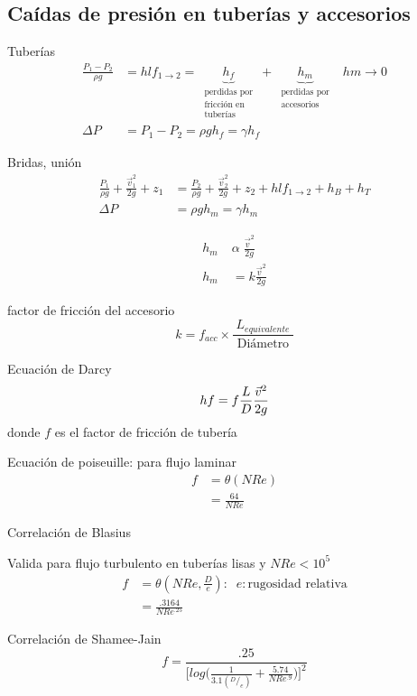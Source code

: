 \subsection{Caídas de presión en tuberías y accesorios}
Tuberías
\[
    \begin{split}
        \frac{ P_{1} - P_{2} }{ \rho g } & = hlf_{1 \to 2} = \underbrace{ h_{f} }_{
            \begin{array}{cc}
                \text{ perdidas por } \\
                \text{ fricción en } \\
                \text{ tuberías }
            \end{array}             
        } + \underbrace{ h_{m} }_{ 
            \begin{array}{cc}
                \text{ perdidas por } \\
                \text{ accesorios }
            \end{array}
        } \;\; hm \to 0 \\
        \Delta P & = P_{1} - P_{2} = \rho g h_{f} = \gamma h_{f}
    \end{split}
\]

Bridas, unión
\[
    \begin{split}
        \frac{ P_{1} }{ \rho g } + \frac{ \Vec{v}_{1}^{2} }{ 2g } + z_{1} & = \frac{ P_{2} }{ \rho g } + \frac{ \Vec{v}_{2}^{2} }{ 2g } + z_{2} + hlf_{1 \to 2} + h_{B} + h_{T} \\
        \Delta P & = \rho g h_{m} = \gamma h_{m}
    \end{split}
\]

\[
    \begin{split}
        h_{m} \; & \alpha \; \frac{ \Vec{v}^{2} }{ 2g } \\
        h_{m} & = k \frac{ \Vec{v}^{2} }{ 2g }
    \end{split}
\]

factor de fricción del accesorio
\[
    k = f_{acc} \times \frac{ L_{equivalente} }{ \text{ Diámetro } }
\]

Ecuación de Darcy
\[
    hf = f \frac{ L }{ D } \frac{ \Vec{v}^{2} }{ 2g } \\
\]
donde \( f \) es el factor de fricción de tubería 

Ecuación de poiseuille: para flujo laminar
\[
    \begin{split}
        f & = \theta(NRe) \\
        & = \frac{ 64 }{ NRe }
    \end{split}
\]

Correlación de Blasius 

Valida para flujo turbulento en tuberías lisas y \( NRe <  10^{5} \) \\
\[
    \begin{split}
        f & = \theta(NRe, \frac{ D }{ e }): \;\; e: \text{rugosidad relativa} \\
        & = \frac{ .3164 }{ NRe^{.25} }
    \end{split}
\]

Correlación de Shamee-Jain
\[
    f = \frac{ .25 }{ \Big[ log \Big( \frac{ 1 }{ 3.1 ( {}^{D}/_{e} ) } + \frac{ 5.74 }{ NRe^{.9} } \Big) \Big]^{ 2 } } 
\]